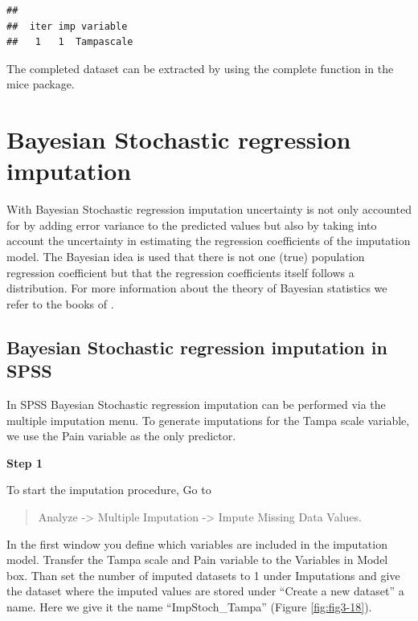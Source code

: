 \documentclass[]{book}
\begin{document}
\begin{verbatim}
## 
##  iter imp variable
##   1   1  Tampascale
\end{verbatim}

The completed dataset can be extracted by using the complete function in
the mice package.

\section{Bayesian Stochastic regression
imputation}\label{bayesian-stochastic-regression-imputation}

With Bayesian Stochastic regression imputation uncertainty is not only
accounted for by adding error variance to the predicted values but also
by taking into account the uncertainty in estimating the regression
coefficients of the imputation model. The Bayesian idea is used that
there is not one (true) population regression coefficient but that the
regression coefficients itself follows a distribution. For more
information about the theory of Bayesian statistics we refer to the
books of
\citep{box2007bayesianinferencein, enders2010applied, gelman2014bayesian}.

\subsection{Bayesian Stochastic regression imputation in
SPSS}\label{bayesian-stochastic-regression-imputation-in-spss}

In SPSS Bayesian Stochastic regression imputation can be performed via
the multiple imputation menu. To generate imputations for the Tampa
scale variable, we use the Pain variable as the only predictor.

\textbf{Step 1}

To start the imputation procedure, Go to

\begin{quote}
Analyze -\textgreater{} Multiple Imputation -\textgreater{} Impute
Missing Data Values.
\end{quote}

In the first window you define which variables are included in the
imputation model. Transfer the Tampa scale and Pain variable to the
Variables in Model box. Than set the number of imputed datasets to 1
under Imputations and give the dataset where the imputed values are
stored under ``Create a new dataset'' a name. Here we give it the name
``ImpStoch\_Tampa'' (Figure \ref{fig:fig3-18}).
\end{document}

